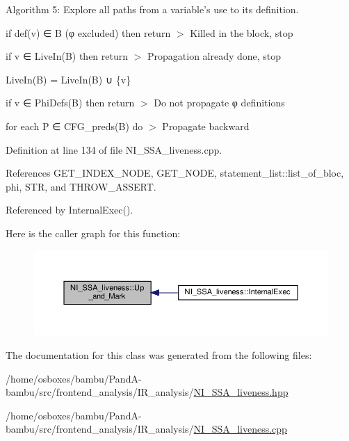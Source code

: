Algorithm 5\+: Explore all paths from a variable’s use to its definition. 

if def(v) ∈ B (φ excluded) then return $>$ Killed in the block, stop

if v ∈ Live\+In(\+B) then return $>$ Propagation already done, stop

Live\+In(\+B) = Live\+In(\+B) ∪ \{v\}

if v ∈ Phi\+Defs(\+B) then return $>$ Do not propagate φ definitions

for each P ∈ C\+F\+G\+\_\+preds(\+B) do $>$ Propagate backward 

Definition at line 134 of file N\+I\+\_\+\+S\+S\+A\+\_\+liveness.\+cpp.



References G\+E\+T\+\_\+\+I\+N\+D\+E\+X\+\_\+\+N\+O\+DE, G\+E\+T\+\_\+\+N\+O\+DE, statement\+\_\+list\+::list\+\_\+of\+\_\+bloc, phi, S\+TR, and T\+H\+R\+O\+W\+\_\+\+A\+S\+S\+E\+RT.



Referenced by Internal\+Exec().

Here is the caller graph for this function\+:
\nopagebreak
\begin{figure}[H]
\begin{center}
\leavevmode
\includegraphics[width=350pt]{d6/db7/classNI__SSA__liveness_a4d59889b909cf697aafcfa562e93ecf8_icgraph}
\end{center}
\end{figure}


The documentation for this class was generated from the following files\+:\begin{DoxyCompactItemize}
\item 
/home/osboxes/bambu/\+Pand\+A-\/bambu/src/frontend\+\_\+analysis/\+I\+R\+\_\+analysis/\hyperlink{NI__SSA__liveness_8hpp}{N\+I\+\_\+\+S\+S\+A\+\_\+liveness.\+hpp}\item 
/home/osboxes/bambu/\+Pand\+A-\/bambu/src/frontend\+\_\+analysis/\+I\+R\+\_\+analysis/\hyperlink{NI__SSA__liveness_8cpp}{N\+I\+\_\+\+S\+S\+A\+\_\+liveness.\+cpp}\end{DoxyCompactItemize}
